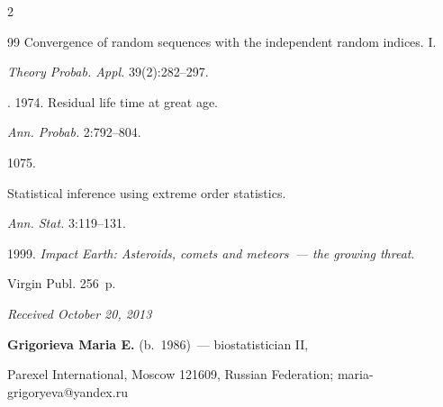 \begin{multicols}{2}
{{\begin{thebibliography}{99}
Convergence of random sequences with the independent random indices. I. 


\textit{Theory Probab.  Appl.} 39(2):282--297.




. 1974. Residual life time at great age.


\textit{Ann. Probab.} 2:792--804. 





 




  1075.


Statistical inference using extreme order statistics.


\textit{Ann. Stat.} 3:119--131.













 1999. \textit{Impact Earth: Asteroids, comets and meteors~--- the growing threat}.


Virgin Publ. 256~p.





\end{thebibliography}


} }





\end{multicols}





\hfill{\small\textit{Received October 20, 2013}}





\Contr





\noindent


\textbf{Grigorieva Maria E.} (b.\ 1986)~--- biostatistician II, 


Parexel International, Moscow 121609, Russian Federation;  maria-grigoryeva@yandex.ru





\vspace*{3pt}





